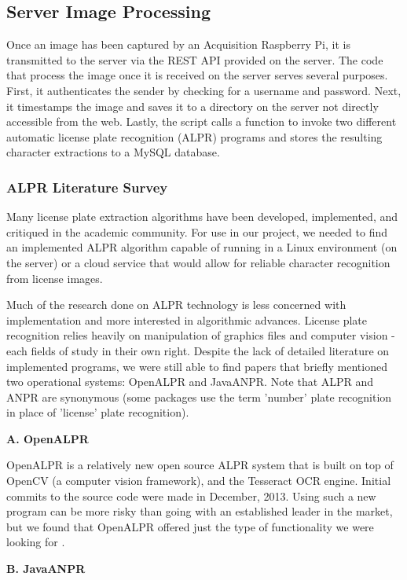 \documentclass[11pt, oneside, fullpage, doublespace]{article}
\begin{document}
\subsection{Server Image Processing}
Once an image has been captured by an Acquisition Raspberry Pi, it is transmitted to the server via the REST API provided on the server. The code that process the image once it is received on the server serves several purposes. First, it authenticates the sender by checking for a username and password. Next, it timestamps the image and saves it to a directory on the server not directly accessible from the web. Lastly, the script calls a function to invoke two different automatic license plate recognition (ALPR) programs and stores the resulting character extractions to a MySQL database.

\subsubsection{ALPR Literature Survey}
Many license plate extraction algorithms have been developed, implemented, and critiqued in the academic community. For use in our project, we needed to find an implemented ALPR algorithm capable of running in a Linux environment (on the server) or a cloud service that would allow for reliable character recognition from license images.

Much of the research done on ALPR technology is less concerned with implementation and more interested in algorithmic advances. License plate recognition relies heavily on manipulation of graphics files and computer vision - each fields of study in their own right. Despite the lack of detailed literature on implemented programs, we were still able to find papers that briefly mentioned two operational systems: OpenALPR and JavaANPR. Note that ALPR and ANPR are synonymous (some packages use the term 'number' plate recognition in place of 'license' plate recognition).

\textbf{A. OpenALPR}

OpenALPR is a relatively new open source ALPR system that is built on top of OpenCV (a computer vision framework), and the Tesseract OCR engine. Initial commits to the source code were made in December, 2013. Using such a new program can be more risky than going with an established leader in the market, but we found that OpenALPR offered just the type of functionality we were looking for \cite{openalpr}.

\textbf{B. JavaANPR}
\end{document}
